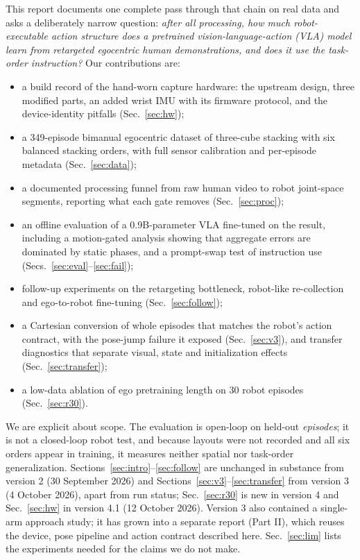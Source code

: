 \documentclass[conference,10pt]{IEEEtran}
\begin{document}
This report documents one complete pass through that chain on real data and asks a deliberately narrow question:
\emph{after all processing, how much robot-executable action structure does a pretrained vision-language-action (VLA) model
learn from retargeted egocentric human demonstrations, and does it use the task-order instruction?} Our contributions are:
\begin{itemize}
\item a build record of the hand-worn capture hardware: the upstream design, three modified parts, an added wrist IMU
with its firmware protocol, and the device-identity pitfalls (Sec.~\ref{sec:hw});
\item a 349-episode bimanual egocentric dataset of three-cube stacking with six balanced stacking orders, with full sensor
calibration and per-episode metadata (Sec.~\ref{sec:data});
\item a documented processing funnel from raw human video to robot joint-space segments, reporting what each gate removes
(Sec.~\ref{sec:proc});
\item an offline evaluation of a 0.9B-parameter VLA fine-tuned on the result, including a motion-gated analysis showing that
aggregate errors are dominated by static phases, and a prompt-swap test of instruction use (Secs.~\ref{sec:eval}--\ref{sec:fail});
\item follow-up experiments on the retargeting bottleneck, robot-like re-collection and ego-to-robot fine-tuning (Sec.~\ref{sec:follow});
\item a Cartesian conversion of whole episodes that matches the robot's action contract, with the pose-jump failure it
exposed (Sec.~\ref{sec:v3}), and transfer diagnostics that separate visual, state and initialization effects (Sec.~\ref{sec:transfer});
\item a low-data ablation of ego pretraining length on 30 robot episodes (Sec.~\ref{sec:r30}).
\end{itemize}
We are explicit about scope. The evaluation is open-loop on held-out \emph{episodes}; it is not a closed-loop robot test,
and because layouts were not recorded and all six orders appear in training, it measures neither spatial nor task-order
generalization. Sections~\ref{sec:intro}--\ref{sec:follow} are unchanged in substance from version 2 (30 September 2026) and
Sections~\ref{sec:v3}--\ref{sec:transfer} from version 3 (4 October 2026), apart from run status; Sec.~\ref{sec:r30} is new in version 4 and Sec.~\ref{sec:hw} in version 4.1 (12 October 2026).
Version 3 also contained a single-arm approach study; it has grown into a separate report (Part II), which reuses the
device, pose pipeline and action contract described here. Sec.~\ref{sec:lim} lists the experiments needed for the claims we
do not make.
\end{document}
